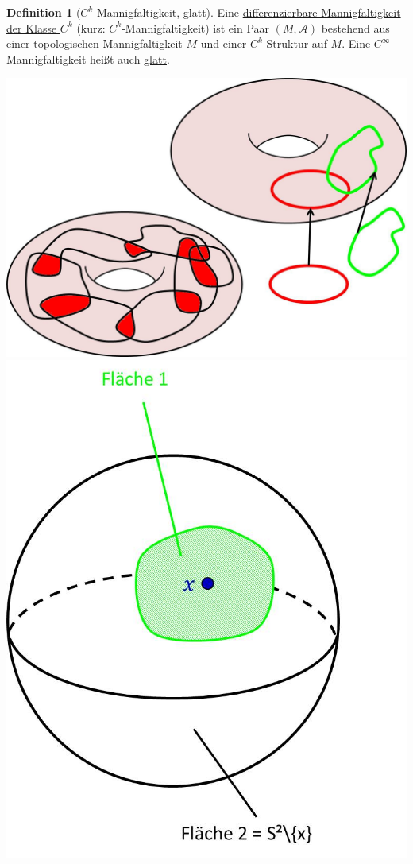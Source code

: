 \documentclass[a4paper,11pt,notitlepage]{report}
\theoremstyle{remark}
\theoremstyle{definition}
\newtheorem{definition}{Definition}[chapter]
\begin{document}
\begin{definition}[$C^k$-Mannigfaltigkeit, glatt]
	Eine \underline{differenzierbare Mannigfaltigkeit der Klasse $C^k$} (kurz: $C^k$-Mannigfaltigkeit) ist ein Paar $(M,\mathcal{A})$ bestehend aus einer topologischen Mannigfaltigkeit $M$ und einer $C^k$-Struktur auf $M$. Eine $C^\infty$-Mannigfaltigkeit heißt auch \underline{\underline{glatt}}.
	\newline
\end{definition}
\includegraphics[scale=0.4]{images/Verkleben.jpg}
\includegraphics[scale=0.4]{images/Verkleben_S2.jpg}
\end{document}
